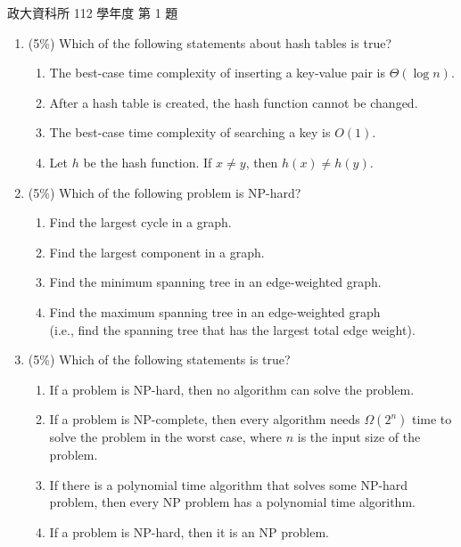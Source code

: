 \begin{pastexam}[label={px:nccu-112-dsa-01}]{政大資科所 112 學年度 第 1 題}
\begin{enumerate}[label=\arabic*),itemsep=2pt,topsep=2pt]
A.~Red black tree. \qquad B.~Stack. \qquad C.~Fibonacci heap. \qquad D.~Hash table.

\item (5\%) Which of the following statements about hash tables is true?
\begin{enumerate}[label=\Alph*.,itemsep=0pt,topsep=2pt]
\item The best-case time complexity of inserting a key-value pair is $\Theta(\log n)$.
\item After a hash table is created, the hash function cannot be changed.
\item The best-case time complexity of searching a key is $O(1)$.
\item Let $h$ be the hash function. If $x\ne y$, then $h(x)\ne h(y)$.
\end{enumerate}

\item (5\%) Which of the following problem is NP-hard?
\begin{enumerate}[label=\Alph*.,itemsep=0pt,topsep=2pt]
\item Find the largest cycle in a graph.
\item Find the largest component in a graph.
\item Find the minimum spanning tree in an edge-weighted graph.
\item Find the maximum spanning tree in an edge-weighted graph\\
(i.e., find the spanning tree that has the largest total edge weight).
\end{enumerate}

\item (5\%) Which of the following statements is true?
\begin{enumerate}[label=\Alph*.,itemsep=0pt,topsep=2pt]
\item If a problem is NP-hard, then no algorithm can solve the problem.
\item If a problem is NP-complete, then every algorithm needs $\Omega(2^n)$ time to solve the
problem in the worst case, where $n$ is the input size of the problem.
\item If there is a polynomial time algorithm that solves some NP-hard problem, then every NP
problem has a polynomial time algorithm.
\item If a problem is NP-hard, then it is an NP problem.
\end{enumerate}


\end{enumerate}
\end{pastexam}
